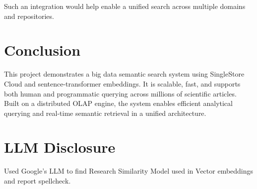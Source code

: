 \documentclass[11pt]{article}
\begin{document}
Such an integration would help enable a unified search across multiple domains and repositories.
\section{Conclusion}
\label{sec:org5c3e6bb}

This project demonstrates a big data semantic search system using SingleStore Cloud and sentence-transformer embeddings. It is scalable, fast, and supports both human and programmatic querying across millions of scientific articles. Built on a distributed OLAP engine, the system enables efficient analytical querying and real-time semantic retrieval in a unified architecture.
\section{LLM Disclosure}
\label{sec:org1063030}

Used Google's LLM to find Research Similarity Model used in Vector embeddings and report spellcheck.
\end{document}
